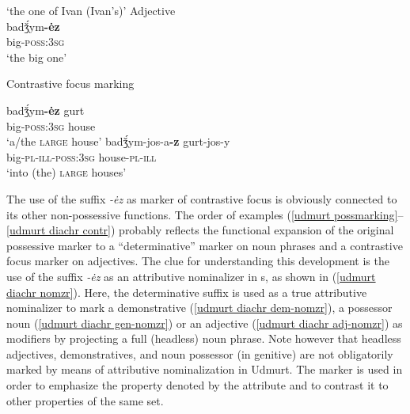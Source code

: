 \begin{exe}
\begin{xlist}
\begin{xlist}
\glt	 ‘the one of Ivan (Ivan's)’
\ex 	\rm{Adjective}\\ \label{udmurt diachr adj-nomzr}
\gll	badǯ́ym\textbf{-ėz}\\
	big-\textsc{poss:3sg}\\
\glt	 ‘the big one’
\end{xlist}
\ex \rm{Contrastive focus marking} \label{udmurt diachr contr}
\begin{xlist}
\ex	
\gll	badǯ́ym\textbf{-ėz} gurt\\
	big-\textsc{poss:3sg} house\\
\glt	‘a/the \textsc{large} house’
\ex	
\gll	badǯ́ym-jos-a\textbf{-z} gurt-jos-y\\
	big-\textsc{pl}-\textsc{ill}-\textsc{poss:3sg} house-\textsc{pl}-\textsc{ill}\\
\glt	‘into (the) \textsc{large} houses’
\end{xlist}
\end{xlist}
\end{exe}
The use of the suffix \textit{-ėz} as marker of contrastive focus is obviously connected to its other non-possessive functions. The order of examples (\ref{udmurt possmarking}–\ref{udmurt diachr contr}) probably reflects the functional expansion of the original possessive marker to a “determinative” marker on noun phrases and a contrastive focus marker on adjectives. The clue for understanding this development is the use of the suffix \textit{-ėz} as an attributive nominalizer in s, as shown in (\ref{udmurt diachr nomzr}). Here, the determinative suffix is used as a true attributive nominalizer to mark a demonstrative (\ref{udmurt diachr dem-nomzr}), a possessor noun (\ref{udmurt diachr gen-nomzr}) or an adjective (\ref{udmurt diachr adj-nomzr}) as modifiers by projecting a full (headless) noun phrase. Note however that headless adjectives, demonstratives, and noun possessor (in genitive) are not obligatorily marked by means of attributive nominalization in Udmurt. The marker is used in order to emphasize the property denoted by the attribute and to contrast it to other properties of the same set.

